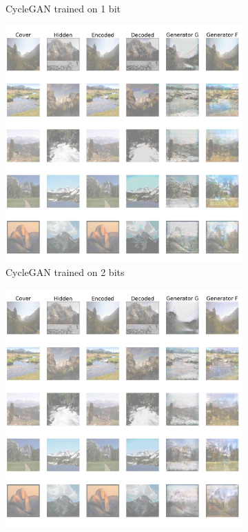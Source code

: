 \documentclass[conference]{IEEEtran}
\begin{document}
\begin{figure}[!hbt]
\begin{subfigure}[b]{0.28\textwidth}
            \caption{CycleGAN trained on 1 bit}
            \label{cycle_gan_new_1}
    \end{subfigure}
    \hspace{0.05\textwidth}
    \begin{subfigure}[b]{0.28\textwidth}
    \centering
            \includegraphics[scale=0.08]{images/cycle_sten_new_2.jpg}
            \caption{CycleGAN trained on 2 bits}
            \label{cycle_gan_new_2}
    \end{subfigure}
    \hspace{0.05\textwidth}
    \begin{subfigure}[b]{0.28\textwidth}
    \centering
            \includegraphics[scale=0.08]{images/cycle_sten_new_3.jpg}

\end{subfigure}
\end{figure}
\end{document}
